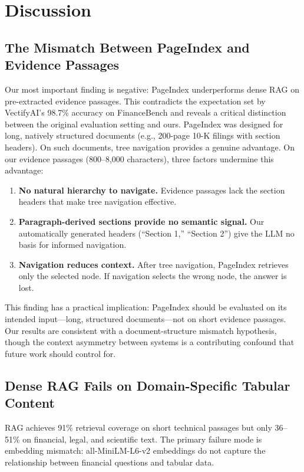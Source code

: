 \documentclass[journal]{IEEEtran}
\begin{document}
\section{Discussion}
\label{sec:discussion}

\subsection{The Mismatch Between PageIndex and Evidence Passages}

Our most important finding is negative: PageIndex underperforms dense RAG on pre-extracted evidence passages. This contradicts the expectation set by VectifyAI's 98.7\% accuracy on FinanceBench and reveals a critical distinction between the original evaluation setting and ours. PageIndex was designed for long, natively structured documents (e.g., 200-page 10-K filings with section headers). On such documents, tree navigation provides a genuine advantage. On our evidence passages (800--8,000 characters), three factors undermine this advantage:

\begin{enumerate}
\item \textbf{No natural hierarchy to navigate.} Evidence passages lack the section headers that make tree navigation effective.
\item \textbf{Paragraph-derived sections provide no semantic signal.} Our automatically generated headers (``Section 1,'' ``Section 2'') give the LLM no basis for informed navigation.
\item \textbf{Navigation reduces context.} After tree navigation, PageIndex retrieves only the selected node. If navigation selects the wrong node, the answer is lost.
\end{enumerate}

This finding has a practical implication: PageIndex should be evaluated on its intended input---long, structured documents---not on short evidence passages. Our results are consistent with a document-structure mismatch hypothesis, though the context asymmetry between systems is a contributing confound that future work should control for.

\subsection{Dense RAG Fails on Domain-Specific Tabular Content}
RAG achieves 91\% retrieval coverage on short technical passages but only 36--51\% on financial, legal, and scientific text. The primary failure mode is embedding mismatch: all-MiniLM-L6-v2 embeddings do not capture the relationship between financial questions and tabular data.
\end{document}
